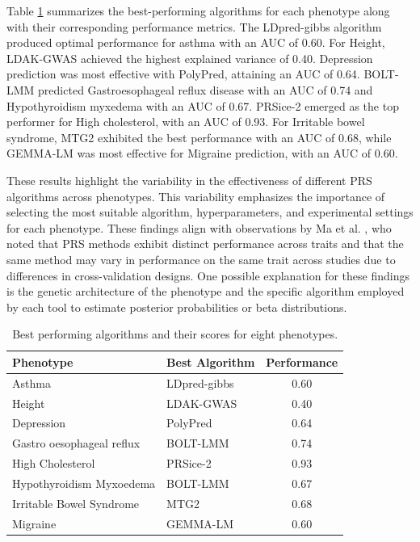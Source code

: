 \documentclass[pdflatex,sn-nature]{sn-jnl}%
\begin{document}
Table \ref{Table2Results} summarizes the best-performing algorithms for each phenotype along with their corresponding performance metrics. The LDpred-gibbs algorithm produced optimal performance for asthma with an AUC of 0.60. For Height, LDAK-GWAS achieved the highest explained variance of 0.40. Depression prediction was most effective with PolyPred, attaining an AUC of 0.64. BOLT-LMM predicted Gastroesophageal reflux disease with an AUC of 0.74 and Hypothyroidism myxedema with an AUC of 0.67. PRSice-2 emerged as the top performer for High cholesterol, with an AUC of 0.93. For Irritable bowel syndrome, MTG2 exhibited the best performance with an AUC of 0.68, while GEMMA-LM was most effective for Migraine prediction, with an AUC of 0.60.

These results highlight the variability in the effectiveness of different PRS algorithms across phenotypes. This variability emphasizes the importance of selecting the most suitable algorithm, hyperparameters, and experimental settings for each phenotype. These findings align with observations by Ma et al. \cite{Ma2021}, who noted that PRS methods exhibit distinct performance across traits and that the same method may vary in performance on the same trait across studies due to differences in cross-validation designs. One possible explanation for these findings is the genetic architecture of the phenotype and the specific algorithm employed by each tool to estimate posterior probabilities or beta distributions.

\begin{table}[!ht]
\centering
\begin{tabular}{|l|l|c|}
\hline
\textbf{Phenotype} & \textbf{Best Algorithm} & \textbf{Performance} \\
\hline
Asthma & LDpred-gibbs & 0.60 \\
\hline
Height & LDAK-GWAS & 0.40 \\
\hline
Depression & PolyPred & 0.64 \\
\hline
Gastro oesophageal reflux & BOLT-LMM & 0.74 \\
\hline
High Cholesterol & PRSice-2 & 0.93 \\
\hline
Hypothyroidism Myxoedema & BOLT-LMM & 0.67 \\
\hline
Irritable Bowel Syndrome & MTG2 & 0.68 \\
\hline
Migraine & GEMMA-LM & 0.60 \\
\hline
\end{tabular}
\caption{Best performing algorithms and their scores for eight phenotypes.}
\label{Table2Results}
\end{table}
\end{document}
